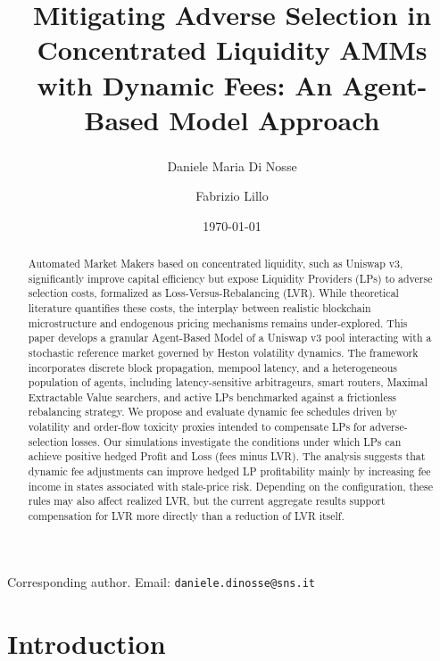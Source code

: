 \documentclass[11pt]{article}
\title{Mitigating Adverse Selection in Concentrated Liquidity AMMs with Dynamic Fees: An Agent-Based Model Approach}
\author[1]{Daniele Maria Di Nosse\textsuperscript{\dag}}
\author[1]{Fabrizio Lillo}
\affil[1]{Scuola Normale Superiore, Pisa, Italy}
\date{\today}
\begin{document}
\maketitle
\begin{center}
  \footnotesize
  \dag Corresponding author. Email: \texttt{daniele.dinosse@sns.it}
\end{center}

\begin{abstract}
Automated Market Makers based on concentrated liquidity, such as Uniswap v3, significantly improve capital 
efficiency but expose Liquidity Providers (LPs) to adverse selection costs, formalized as Loss-Versus-Rebalancing 
(LVR). While theoretical literature quantifies these costs, the interplay between realistic blockchain 
microstructure and endogenous pricing mechanisms remains under-explored. This paper develops a granular 
Agent-Based Model of a Uniswap v3 pool interacting with a stochastic reference market governed by 
Heston volatility dynamics. The framework incorporates discrete block propagation, mempool latency, and a 
heterogeneous population of agents, including latency-sensitive arbitrageurs, smart routers, Maximal Extractable Value searchers, and active LPs benchmarked against a frictionless rebalancing strategy. We propose and
evaluate dynamic fee schedules driven by volatility and order-flow toxicity proxies intended to compensate LPs for
adverse-selection losses. Our simulations investigate the conditions under which LPs can achieve positive hedged Profit
and Loss (fees minus LVR). The analysis suggests that dynamic fee adjustments can improve hedged LP profitability mainly
by increasing fee income in states associated with stale-price risk. Depending on the configuration, these rules may also
affect realized LVR, but the current aggregate results support compensation for LVR more directly than a reduction of LVR
itself.
\end{abstract}


\section{Introduction}
\end{document}
